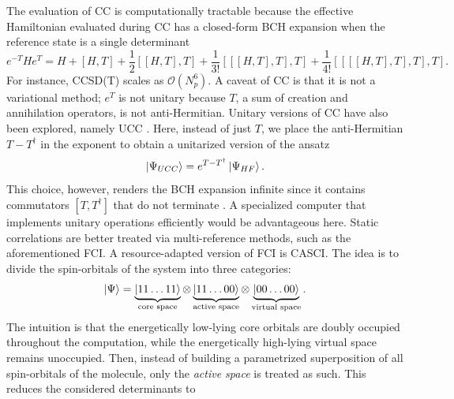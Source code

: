 \documentclass[../main.tex]{subfiles}
\begin{document}
The evaluation of CC is computationally tractable because the effective Hamiltonian evaluated during CC has a closed-form \ac{BCH} expansion when the reference state is a single determinant \cite{romero2018strategies,helgaker1997basis}
\begin{equation}
    e^{-T} H e^{T} = H + [H,T] + \frac{1}{2} [[H,T],T] + \frac{1}{3!} [[[H,T],T],T] +\frac{1}{4!} [[[[H,T],T],T],T].
\end{equation} For instance, CCSD(T) scales as $\mathcal{O}(N_p^6)$.  A caveat of CC is that it is not a variational method; $e^T$ is not unitary because $T$, a sum of creation and annihilation operators, is not anti-Hermitian. Unitary versions of CC have also been explored, namely \ac{UCC} \cite{taube2006new}. Here, instead of just $T$, we place the anti-Hermitian $T-T^\dagger$ in the exponent to obtain a unitarized version of the ansatz \cite{taube2006new, romero2018strategies}
\begin{equation}
    \ket{\Psi_{UCC}} = e^{T-T^\dagger} \ket{\Psi_{HF}}.
\end{equation} This choice, however, renders the \ac{BCH} expansion infinite since it contains commutators $[T,T^\dagger]$ that do not terminate \cite{romero2018strategies}. A specialized computer that implements unitary operations efficiently would be advantageous here.
Static correlations are better treated via multi-reference methods, such as the aforementioned FCI. A resource-adapted version of FCI is \ac{CASCI}.  The idea is to divide the spin-orbitals of the system into three categories:
\begin{equation}
    \ket{\Psi} = \underbrace{\ket{11\dots11}}_\text{core space} \otimes \underbrace{\ket{11\dots00}}_\text{active space} \otimes \underbrace{\ket{00 \dots 00}}_\text{virtual space}.
\end{equation} The intuition is that the energetically low-lying core orbitals are doubly occupied throughout the computation, while the energetically high-lying virtual space remains unoccupied. Then, instead of building a parametrized superposition of all spin-orbitals of the molecule, only the \textit{active space} is treated as such. This reduces the considered determinants to
\end{document}
